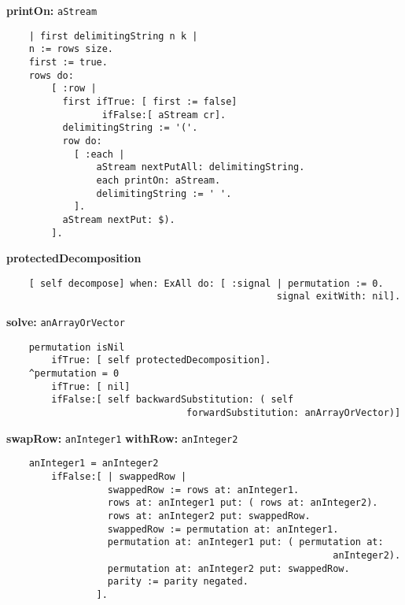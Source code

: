 {\bf printOn:} {\tt aStream}
\begin{verbatim}
    | first delimitingString n k |
    n := rows size.
    first := true.
    rows do:
        [ :row |
          first ifTrue: [ first := false]
                 ifFalse:[ aStream cr].
          delimitingString := '('.
          row do:
            [ :each |
                aStream nextPutAll: delimitingString.
                each printOn: aStream.
                delimitingString := ' '.
            ].
          aStream nextPut: $).
        ].

\end{verbatim}
{\bf protectedDecomposition}
\begin{verbatim}
    [ self decompose] when: ExAll do: [ :signal | permutation := 0. 
                                                signal exitWith: nil].

\end{verbatim}
{\bf solve:} {\tt anArrayOrVector}
\begin{verbatim}
    permutation isNil
        ifTrue: [ self protectedDecomposition].
    ^permutation = 0
        ifTrue: [ nil]
        ifFalse:[ self backwardSubstitution: ( self 
                                forwardSubstitution: anArrayOrVector)]

\end{verbatim}
{\bf swapRow:} {\tt anInteger1} {\bf withRow:} {\tt anInteger2}
\begin{verbatim}
    anInteger1 = anInteger2
        ifFalse:[ | swappedRow |
                  swappedRow := rows at: anInteger1.
                  rows at: anInteger1 put: ( rows at: anInteger2).
                  rows at: anInteger2 put: swappedRow.
                  swappedRow := permutation at: anInteger1.
                  permutation at: anInteger1 put: ( permutation at: 
                                                          anInteger2).
                  permutation at: anInteger2 put: swappedRow.
                  parity := parity negated.
                ].

\end{verbatim}

